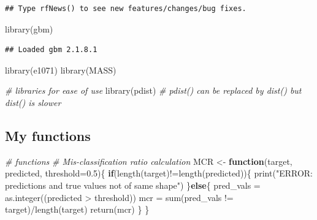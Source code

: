 \documentclass[
  11pt,
]{article}
\newenvironment{Shaded}{\begin{snugshade}}{\end{snugshade}}
\newcommand{\AttributeTok}[1]{\textcolor[rgb]{0.77,0.63,0.00}{#1}}
\newcommand{\CommentTok}[1]{\textcolor[rgb]{0.56,0.35,0.01}{\textit{#1}}}
\newcommand{\ControlFlowTok}[1]{\textcolor[rgb]{0.13,0.29,0.53}{\textbf{#1}}}
\newcommand{\FloatTok}[1]{\textcolor[rgb]{0.00,0.00,0.81}{#1}}
\newcommand{\FunctionTok}[1]{\textcolor[rgb]{0.00,0.00,0.00}{#1}}
\newcommand{\NormalTok}[1]{#1}
\newcommand{\OtherTok}[1]{\textcolor[rgb]{0.56,0.35,0.01}{#1}}
\newcommand{\SpecialCharTok}[1]{\textcolor[rgb]{0.00,0.00,0.00}{#1}}
\newcommand{\StringTok}[1]{\textcolor[rgb]{0.31,0.60,0.02}{#1}}
\begin{document}
\begin{verbatim}
## Type rfNews() to see new features/changes/bug fixes.
\end{verbatim}

\begin{Shaded}
\begin{Highlighting}[]
\FunctionTok{library}\NormalTok{(gbm)}
\end{Highlighting}
\end{Shaded}

\begin{verbatim}
## Loaded gbm 2.1.8.1
\end{verbatim}

\begin{Shaded}
\begin{Highlighting}[]
\FunctionTok{library}\NormalTok{(e1071)}
\FunctionTok{library}\NormalTok{(MASS)}

\CommentTok{\# libraries for ease of use}
\FunctionTok{library}\NormalTok{(pdist) }\CommentTok{\# pdist() can be replaced by dist() but dist() is slower}
\end{Highlighting}
\end{Shaded}

\hypertarget{my-functions}{%
\subsection{My functions}\label{my-functions}}

\begin{Shaded}
\begin{Highlighting}[]
\CommentTok{\# functions}
\CommentTok{\# Mis{-}classification ratio calculation}
\NormalTok{MCR }\OtherTok{\textless{}{-}} \ControlFlowTok{function}\NormalTok{(target, predicted, }\AttributeTok{threshold=}\FloatTok{0.5}\NormalTok{)\{}
  \ControlFlowTok{if}\NormalTok{(}\FunctionTok{length}\NormalTok{(target)}\SpecialCharTok{!=}\FunctionTok{length}\NormalTok{(predicted))\{}
    \FunctionTok{print}\NormalTok{(}\StringTok{"ERROR: predictions and true values not of same shape"}\NormalTok{)}
\NormalTok{  \}}\ControlFlowTok{else}\NormalTok{\{}
\NormalTok{    pred\_vals }\OtherTok{=} \FunctionTok{as.integer}\NormalTok{((predicted }\SpecialCharTok{\textgreater{}}\NormalTok{ threshold))}
\NormalTok{    mcr }\OtherTok{=} \FunctionTok{sum}\NormalTok{(pred\_vals }\SpecialCharTok{!=}\NormalTok{ target)}\SpecialCharTok{/}\FunctionTok{length}\NormalTok{(target)}
    \FunctionTok{return}\NormalTok{(mcr)}
\NormalTok{  \}}
\NormalTok{\}}
\end{Highlighting}
\end{Shaded}
\end{document}
